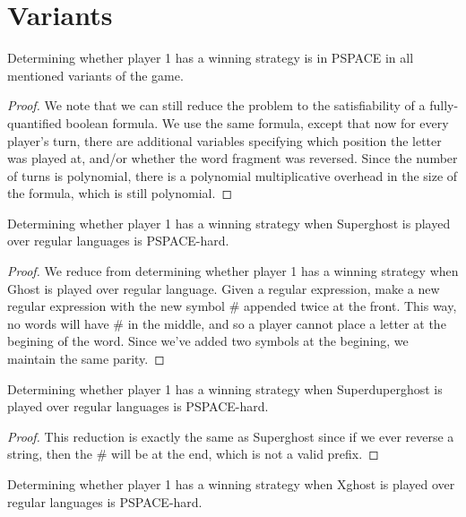 \documentclass[runningheads,a4paper]{llncs}
\begin{document}
\section{Variants}
\label{Variants}

\begin{corollary}
Determining whether player 1 has a winning strategy is in PSPACE in all mentioned variants of the game.
\end{corollary}

\begin{proof}
We note that we can still reduce the problem to the satisfiability of a fully-quantified boolean formula. We use the same formula, except that now for every player's turn, there are additional variables specifying which position the letter was played at, and/or whether the word fragment was reversed. Since the number of turns is polynomial, there is a polynomial multiplicative overhead in the size of the formula, which is still polynomial. 
\end{proof}

\begin{corollary}
Determining whether player 1 has a winning strategy when Superghost is played over regular languages is PSPACE-hard. 
\end{corollary}

\begin{proof}
We reduce from determining whether player 1 has a winning strategy when Ghost is played over regular language. Given a regular expression, make a new regular expression with the new symbol \# appended twice at the front. This way, no words will have \# in the middle, and so a player cannot place a letter at the begining of the word. Since we've added two symbols at the begining, we maintain the same parity.
\end{proof} 

\begin{corollary}
Determining whether player 1 has a winning strategy when Superduperghost is played over regular languages is PSPACE-hard.
\end{corollary}

\begin{proof}
This reduction is exactly the same as Superghost since if we ever reverse a string, then the \# will be at the end, which is not a valid prefix. 
\end{proof}

\begin{corollary}
Determining whether player 1 has a winning strategy when Xghost is played over regular languages is PSPACE-hard. 
\end{corollary}
\end{document}

